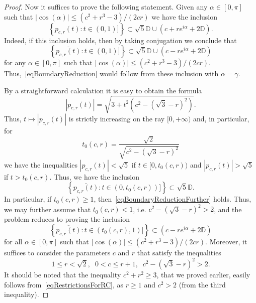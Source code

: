 \documentclass{amsart}
\numberwithin{equation}{section}
\theoremstyle{definition}
\theoremstyle{remark}
\begin{document}
\begin{proof}
		Now it suffices to prove the following statement. Given any $\alpha \in [0, \pi]$ such that $|\cos(\alpha)| \le (c^2 + r^3 - 3)/(2cr)$ we have the inclusion
		\begin{equation}\label{eqBoundaryReductionFurther}
			\left\{p_{c,r}(t):t \in (0,1)]\right\} \subset \sqrt{5}\mathbb D \cup (c + re^{i\alpha} + 2\mathbb D).
		\end{equation}
		Indeed, if this inclusion holds, then by taking conjugation we conclude that
		\[
		\left\{\overline{p_{c,r}(t)}:t \in (0,1)]\right\} \subset \sqrt{5}\mathbb D \cup (c - re^{i\alpha} + 2\mathbb D)
		\]
		for any $\alpha \in [0, \pi]$ such that $|\cos(\alpha)| \le (c^2 + r^3 - 3)/(2cr)$. Thus,~\eqref{eqBoundaryReduction} would follow from these inclusion with $\alpha = \gamma$.
		
		By a straightforward calculation it is easy to obtain the formula
		\[
		|p_{c,r}(t)| = \sqrt{3 + t^2\left(c^2 - \left(\sqrt{3} - r\right)^2\right)}.
		\]
		Thus, $t \mapsto |p_{c,r}(t)|$ is strictly increasing on the ray $[0, +\infty)$ and, in particular, for 
		\[
		t_0(c,r) = \dfrac{\sqrt{2}}{\sqrt{c^2 - \left(\sqrt{3} - r\right)^2}}
		\]
		we have the inequalities $|p_{c,r}(t)| < \sqrt{5}$ if $t \in [0, t_0(c,r))$ and $|p_{c,r}(t)| > \sqrt{5}$ if $t > t_0(c, r)$. Thus, we have the inclusion
		\[
		\left\{\overline{p_{c,r}(t)}:t \in (0,t_0(c,r))]\right\} \subset  \sqrt{5}\mathbb D.
		\]
		In particular, if $t_0(c,r) \ge 1$, then~\eqref{eqBoundaryReductionFurther} holds. Thus, we may further assume that $t_0(c,r) < 1$, i.e. $c^2 - (\sqrt{3} - r)^2 > 2$, and the problem reduces to proving the inclusion
		\begin{equation}\label{eqBoundaryReductionEvenFurther}
			\left\{\overline{p_{c,r}(t)}:t \in (t_0(c, r),1)]\right\} \subset (c - re^{i\alpha} + 2\mathbb D)
		\end{equation}
		for all $\alpha \in [0, \pi]$ such that $|\cos(\alpha)| \le (c^2 + r^3 - 3)/(2cr)$. Moreover, it suffices to consider the parameters $c$ and $r$ that satisfy the inequalities
		\begin{equation}\label{eqRestrictionsForRC}
			1 \le r < \sqrt{2},\;\;0 < c \le r + 1,\;\;c^2 - \left(\sqrt{3} - r\right)^2 > 2.
		\end{equation}
		It should be noted that the inequality $c^2 + r^2 \ge 3$, that we proved earlier, easily follows from~\eqref{eqRestrictionsForRC}, as $r \ge 1$ and $c^2 > 2$ (from the third inequality).
		

\end{proof}
\end{document}

